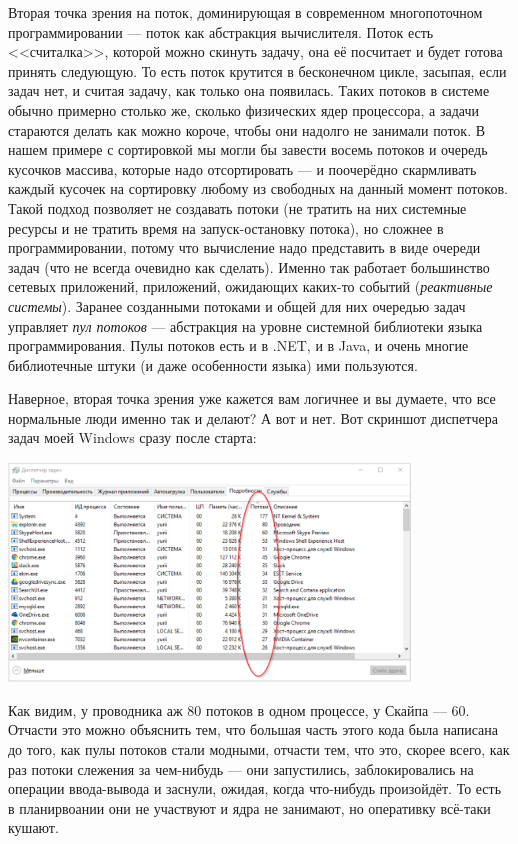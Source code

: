 \documentclass[a5paper]{article}
\begin{document}
Вторая точка зрения на поток, доминирующая в современном многопоточном программировании --- поток как абстракция вычислителя. Поток есть <<считалка>>, которой можно скинуть задачу, она её посчитает и будет готова принять следующую. То есть поток крутится в бесконечном цикле, засыпая, если задач нет, и считая задачу, как только она появилась. Таких потоков в системе обычно примерно столько же, сколько физических ядер процессора, а задачи стараются делать как можно короче, чтобы они надолго не занимали поток. В нашем примере с сортировкой мы могли бы завести восемь потоков и очередь кусочков массива, которые надо отсортировать --- и поочерёдно скармливать каждый кусочек на сортировку любому из свободных на данный момент потоков. Такой подход позволяет не создавать потоки (не тратить на них системные ресурсы и не тратить время на запуск-остановку потока), но сложнее в программировании, потому что вычисление надо представить в виде очереди задач (что не всегда очевидно как сделать). Именно так работает большинство сетевых приложений, приложений, ожидающих каких-то событий (\textit{реактивные системы}). Заранее созданными потоками и общей для них очередью задач управляет \textit{пул потоков} --- абстракция на уровне системной библиотеки языка программирования. Пулы потоков есть и в .NET, и в Java, и очень многие библиотечные штуки (и даже особенности языка) ими пользуются.

Наверное, вторая точка зрения уже кажется вам логичнее и вы думаете, что все нормальные люди именно так и делают? А вот и нет. Вот скриншот диспетчера задач моей Windows сразу после старта:

\begin{center}
    \includegraphics[width=0.8\textwidth]{threadsEverywhere.png}
\end{center}

Как видим, у проводника аж 80 потоков в одном процессе, у Скайпа --- 60. Отчасти это можно объяснить тем, что большая часть этого кода была написана до того, как пулы потоков стали модными, отчасти тем, что это, скорее всего, как раз потоки слежения за чем-нибудь --- они запустились, заблокировались на операции ввода-вывода и заснули, ожидая, когда что-нибудь произойдёт. То есть в планирвоании они не участвуют и ядра не занимают, но оперативку всё-таки кушают.
\end{document}
